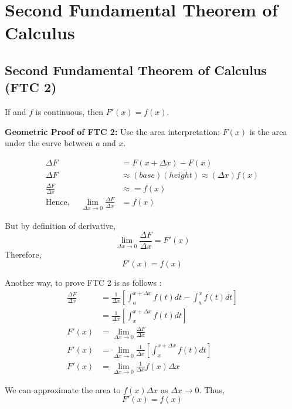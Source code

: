 

\chapter{Second Fundamental Theorem of Calculus}
\bigbreak

\section{Second Fundamental Theorem of Calculus (FTC 2)}

\begin{mdframed}
\begin{center}
    If  and $f$ is continuous, then $F'(x) = f(x)$.
\end{center}
\end{mdframed}

{\bf Geometric Proof of FTC 2: } Use the area interpretation: $F(x)$ is the area under the curve between $a$ and $x$.

\begin{align*}
    \Delta F & = F(x + \Delta x) - F(x) \\
    \Delta F & \approx (base)(height) \approx (\Delta x)f(x) \\
    \frac{\Delta F}{\Delta x} & \approx = f(x) \\
    \text{Hence, } \quad \lim_{\Delta x \to 0} \frac{\Delta F}{\Delta x} & = f(x)
\end{align*}

But by definition of derivative, $$\lim_{\Delta x \to 0} \frac{\Delta F}{\Delta x} = F'(x)$$
Therefore, $$F'(x) = f(x)$$

Another way, to prove FTC 2 is as follows : 
\begin{align*}
    \frac{\Delta F}{\Delta x} & = \frac{1}{\Delta x} \left[ \int_a^{x+\Delta x} f(t) dt - \int_a^x f(t) dt \right] \\
        & = \frac{1}{\Delta x} \left[ \int_x^{x+\Delta x} f(t) dt \right] \\
    F'(x) & = \lim_{\Delta x \to 0} \frac{\Delta F}{\Delta x} \\
    F'(x) & = \lim_{\Delta x \to 0} \frac{1}{\Delta x} \left[ \int_x^{x+\Delta x} f(t) dt \right] \\
    F'(x) & = \lim_{\Delta x \to 0} \frac{1}{\Delta x} f(x) \Delta x
\end{align*}

We can approximate the area to $f(x) \Delta x$ as $\Delta x \to 0$. Thus, $$ F'(x) = f(x) $$
